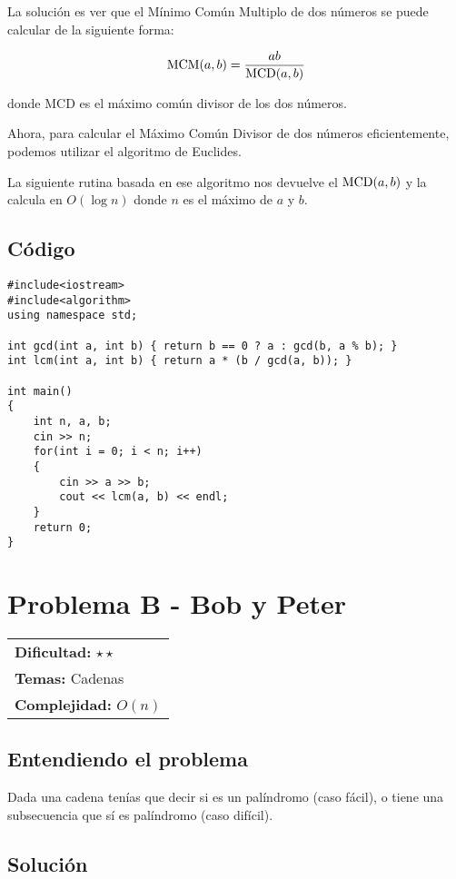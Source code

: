 La solución es ver que el Mínimo Común Multiplo de dos números se puede calcular de la siguiente forma:

$$\textnormal{MCM}(a,b) = \frac{ab}{\textnormal{MCD}(a, b)}$$

donde MCD es el máximo común divisor de los dos números.

Ahora, para calcular el Máximo Común Divisor de dos números eficientemente, podemos utilizar el algoritmo de Euclides.

La siguiente rutina basada en ese algoritmo nos devuelve el $\textnormal{MCD}(a, b)$ y la calcula en $O(\log n)$ donde $n$ es el máximo de $a$ y $b$.

\subsection*{Código}
\begin{verbatim}
#include<iostream>
#include<algorithm>
using namespace std;
 
int gcd(int a, int b) { return b == 0 ? a : gcd(b, a % b); }
int lcm(int a, int b) { return a * (b / gcd(a, b)); }
 
int main()
{
    int n, a, b;
    cin >> n;
    for(int i = 0; i < n; i++)
    {
        cin >> a >> b;
        cout << lcm(a, b) << endl;
    }
    return 0;
}
\end{verbatim}

\section{Problema B - Bob y Peter}

\hfill
\begin{tabular}{@{}l@{}}
\textbf{Dificultad:} $\star \star$ \\
\textbf{Temas:} Cadenas \\
\textbf{Complejidad:} $O(n)$
\end{tabular}

\subsection*{Entendiendo el problema}
Dada una cadena tenías que decir si es un palíndromo (caso fácil), o tiene una subsecuencia que sí es palíndromo (caso difícil).

\subsection*{Solución}

